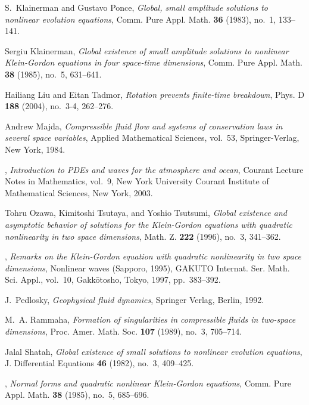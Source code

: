 \documentclass[12pt]{amsart}
\numberwithin{equation}{section} \numberwithin{theorem}{section}
\numberwithin{example}{section} \numberwithin{remark}{section}
\numberwithin{figure}{section} \numberwithin{algorithm}{section}
\begin{document}
\begin{thebibliography}{10}
S.~Klainerman and Gustavo Ponce, \emph{Global, small amplitude solutions to
  nonlinear evolution equations}, Comm. Pure Appl. Math. \textbf{36} (1983),
  no.~1, 133--141.

Sergiu Klainerman, \emph{Global existence of small amplitude solutions to
  nonlinear {K}lein-{G}ordon equations in four space-time dimensions}, Comm.
  Pure Appl. Math. \textbf{38} (1985), no.~5, 631--641.

Hailiang Liu and Eitan Tadmor, \emph{Rotation prevents finite-time breakdown}, Phys. D \textbf{188}  (2004), no.~3-4, 262--276.

Andrew Majda, \emph{Compressible fluid flow and systems of conservation laws in
  several space variables}, Applied Mathematical Sciences, vol.~53,
  Springer-Verlag, New York, 1984.

\bysame, \emph{Introduction to {PDE}s and waves for the atmosphere and ocean},
  Courant Lecture Notes in Mathematics, vol.~9, New York University Courant
  Institute of Mathematical Sciences, New York, 2003.

Tohru Ozawa, Kimitoshi Tsutaya, and Yoshio Tsutsumi, \emph{Global existence and
  asymptotic behavior of solutions for the {K}lein-{G}ordon equations with
  quadratic nonlinearity in two space dimensions}, Math. Z. \textbf{222}
  (1996), no.~3, 341--362.

\bysame, \emph{Remarks on the {K}lein-{G}ordon equation with quadratic
  nonlinearity in two space dimensions}, Nonlinear waves ({S}apporo, 1995),
  GAKUTO Internat. Ser. Math. Sci. Appl., vol.~10, Gakk\=otosho, Tokyo, 1997,
  pp.~383--392. 

J.~Pedlosky, \emph{Geophysical fluid dynamics}, Springer Verlag, Berlin, 1992.

M.~A. Rammaha, \emph{Formation of singularities in compressible fluids in
  two-space dimensions}, Proc. Amer. Math. Soc. \textbf{107} (1989), no.~3,
  705--714.

Jalal Shatah, \emph{Global existence of small solutions to nonlinear evolution
  equations}, J. Differential Equations \textbf{46} (1982), no.~3, 409--425.

\bysame, \emph{Normal forms and quadratic nonlinear {K}lein-{G}ordon
  equations}, Comm. Pure Appl. Math. \textbf{38} (1985), no.~5, 685--696.


\end{thebibliography}
\end{document}
